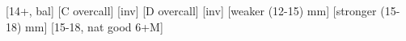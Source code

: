 \begin{bidsemi}
[14+, bal]
[C overcall]
    [inv]
[D overcall]
    [inv]
[weaker (12-15) mm]
[stronger (15-18) mm]
[15-18, nat good 6+M]
\end{bidsemi}